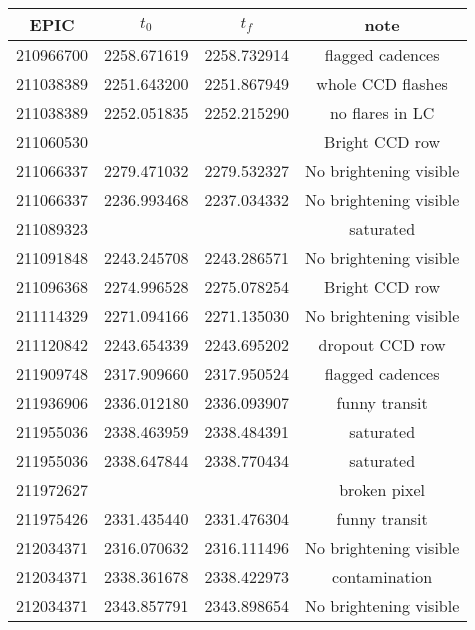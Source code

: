 \begin{tabular}{cccc}
\toprule
      EPIC &        $t_0$ &        $t_f$ &                    note \\
\midrule
 210966700 &  2258.671619 &  2258.732914 &        flagged cadences \\
 211038389 &  2251.643200 &  2251.867949 &       whole CCD flashes \\
 211038389 &  2252.051835 &  2252.215290 &         no flares in LC \\
 211060530 &              &              &          Bright CCD row \\
 211066337 &  2279.471032 &  2279.532327 &  No brightening visible \\
 211066337 &  2236.993468 &  2237.034332 &  No brightening visible \\
 211089323 &              &              &               saturated \\
 211091848 &  2243.245708 &  2243.286571 &  No brightening visible \\
 211096368 &  2274.996528 &  2275.078254 &          Bright CCD row \\
 211114329 &  2271.094166 &  2271.135030 &  No brightening visible \\
 211120842 &  2243.654339 &  2243.695202 &         dropout CCD row \\
 211909748 &  2317.909660 &  2317.950524 &        flagged cadences \\
 211936906 &  2336.012180 &  2336.093907 &           funny transit \\
 211955036 &  2338.463959 &  2338.484391 &               saturated \\
 211955036 &  2338.647844 &  2338.770434 &               saturated \\
 211972627 &              &              &            broken pixel \\
 211975426 &  2331.435440 &  2331.476304 &           funny transit \\
 212034371 &  2316.070632 &  2316.111496 &  No brightening visible \\
 212034371 &  2338.361678 &  2338.422973 &           contamination \\
 212034371 &  2343.857791 &  2343.898654 &  No brightening visible \\
\bottomrule
\end{tabular}
